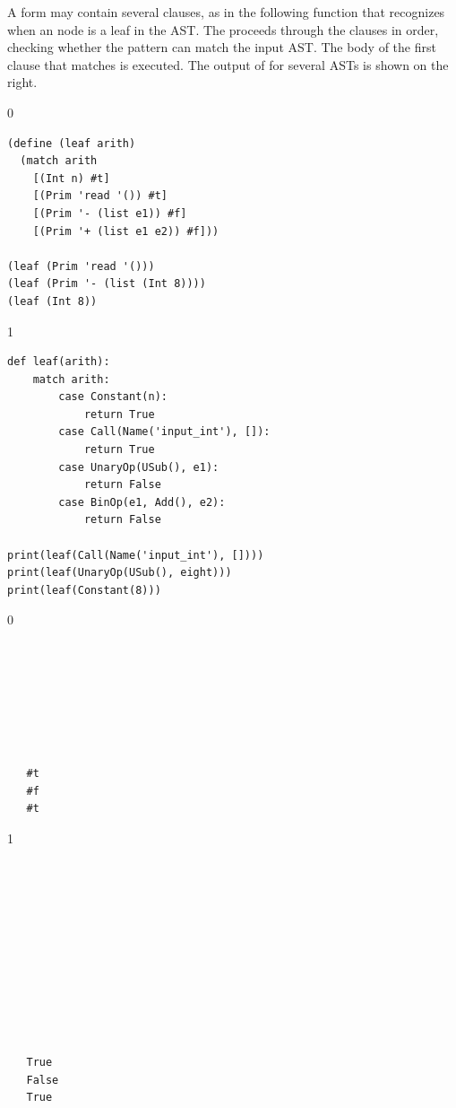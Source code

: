 \documentclass[7x10]{TimesAPriori_MIT}%
\def\racketEd{0}
\def\pythonEd{1}
\def\edition{1}
\begin{document}
A  form may contain several clauses, as in the following
function  that recognizes when an \LangInt{} node is a leaf in
the AST. The  proceeds through the clauses in order,
checking whether the pattern can match the input AST. The body of the
first clause that matches is executed. The output of  for
several ASTs is shown on the right.
\begin{center}
\begin{minipage}{0.6\textwidth}
{\if\edition\racketEd
\begin{lstlisting}
(define (leaf arith)
  (match arith
    [(Int n) #t]
    [(Prim 'read '()) #t]
    [(Prim '- (list e1)) #f]
    [(Prim '+ (list e1 e2)) #f]))

(leaf (Prim 'read '()))
(leaf (Prim '- (list (Int 8))))
(leaf (Int 8))
\end{lstlisting}
\fi}
{\if\edition\pythonEd
\begin{lstlisting}
def leaf(arith):
    match arith:
        case Constant(n):
            return True
        case Call(Name('input_int'), []):
            return True
        case UnaryOp(USub(), e1):
            return False
        case BinOp(e1, Add(), e2):
            return False

print(leaf(Call(Name('input_int'), [])))
print(leaf(UnaryOp(USub(), eight)))
print(leaf(Constant(8)))
\end{lstlisting}
\fi}
\end{minipage}
\vrule
\begin{minipage}{0.25\textwidth}
{\if\edition\racketEd  
  \begin{lstlisting}






    
   #t
   #f
   #t
\end{lstlisting}
  \fi}
{\if\edition\pythonEd
\begin{lstlisting}






    



    
   True
   False
   True
\end{lstlisting}
\fi}
\end{minipage}
\end{center}
\end{document}

